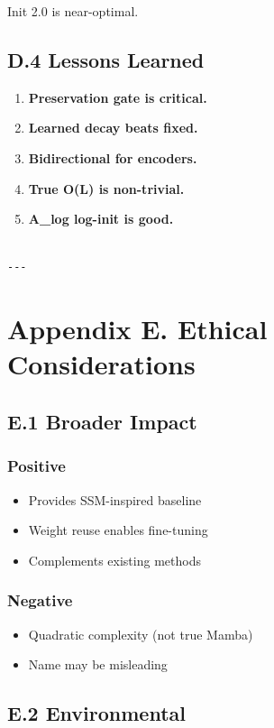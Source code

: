 Init 2.0 is near-optimal.

\subsection{D.4 Lessons Learned}

\begin{enumerate}
\item \textbf{Preservation gate is critical.}
\item \textbf{Learned decay beats fixed.}
\item \textbf{Bidirectional for encoders.}
\item \textbf{True O(L) is non-trivial.}
\item \textbf{A\_log log-init is good.}
\end{enumerate}
\begin{lstlisting}

---
\end{lstlisting}

\section{Appendix E. Ethical Considerations}

\subsection{E.1 Broader Impact}

\subsubsection{Positive}
\begin{itemize}
\item Provides SSM-inspired baseline
\item Weight reuse enables fine-tuning
\item Complements existing methods

\end{itemize}
\subsubsection{Negative}
\begin{itemize}
\item Quadratic complexity (not true Mamba)
\item Name may be misleading

\end{itemize}
\subsection{E.2 Environmental}

